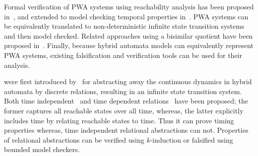  Formal verification of PWA
systems using reachability analysis has been proposed
in~\cite{yordanov2010formal, koutsoukos2003safety,
asarin2000approximate}, and extended to model checking temporal
properties in~\cite{yordanov2007model, batt2007model}. PWA systems can
be equivalently translated to non-deterministic infinite state
transition systems and then model checked.  Related approaches using a
bisimilar quotient have been proposed in~\cite{pappas2003bisimilar,
tabuada2006linear, yordanov2007model}. Finally, because hybrid
automata models can equivalently represent PWA systems, existing
falsification and verification tools can be used for their analysis.

 were first introduced
by~\cite{Sankaranarayanan+Tiwari/2011/Relational} for abstracting away the
continuous dynamics in hybrid automata by discrete relations, %
resulting in an infinite state transition system.  Both time
independent~\cite{Sankaranarayanan+Tiwari/2011/Relational} and time
dependent relations~\cite{zutshi2012timed, mover2013time} have been
proposed; the former captures all reachable states over all time,
whereas, the latter explicitly includes time by relating reachable
states to time. Thus it can prove timing properties whereas, time
independent relational abstractions can not. Properties of relational
abstractions can be verified using $k$-induction or falsified
using bounded model checkers.









